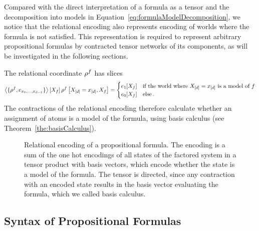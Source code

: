 Compared with the direct interpretation of a formula as a tensor and the decomposition into models in Equation~\ref{eq:formulaModelDecomposition}, we notice that the relational encoding also represents encoding of worlds where the formula is not satisfied.
This representation is required to represent arbitrary propositional formulas by contracted tensor networks of its components, as will be investigated in the following sections.


The relational coordinate $\rho^{f}$ has slices
\begin{align}
		\left\langle \{\rho^{f},e_{{x_{0},\ldots,x_{d-1}}}\}\right\rangle \left[ X_{f} \right] 
		\rho^{f}\left[X_{[d]}=x_{[d]},X_{f}\right]
		= \begin{cases}
		e_1[X_{f}] & \text{if the world where $X_{[d]}=x_{[d]}$ is a model of $f$}  \\
		e_0[X_{f}] & \text{else}\, .
		\end{cases}
\end{align} 
The contractions of the relational encoding therefore calculate whether an assignment of atoms is a model of the formula, using basis calculus (see Theorem~\ref{the:basisCalculus}).

\begin{figure}[h]
\begin{center}
	
\end{center}
\caption{Relational encoding of a propositional formula. 
The encoding is a sum of the one hot encodings of all states of the factored system in a tensor product with basis vectors, which encode whether the state is a model of the formula.
The tensor is directed, since any contraction with an encoded state results in the basis vector evaluating the formula, which we called basis calculus.
}
\label{fig:formulaRencoding} 
\end{figure}










\subsection{Syntax of Propositional Formulas}

